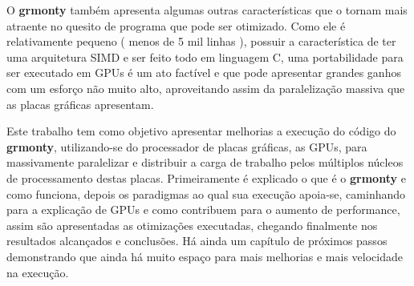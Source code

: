 O \textbf{grmonty} também apresenta algumas outras características que o tornam mais atraente no quesito de programa que pode ser otimizado. Como ele é relativamente pequeno ( menos de 5 mil linhas ), possuir a característica de ter uma arquitetura SIMD e ser feito todo em linguagem C, uma portabilidade para ser executado em GPUs é um ato factível e que pode apresentar grandes ganhos com um esforço não muito alto, aproveitando assim da paralelização massiva que as placas gráficas apresentam.

Este trabalho tem como objetivo apresentar melhorias a execução do código do \textbf{grmonty}, utilizando-se do processador de placas gráficas, as GPUs, para massivamente paralelizar e distribuir a carga de trabalho pelos múltiplos núcleos de processamento destas placas. Primeiramente é explicado o que é o \textbf{grmonty} e como funciona, depois os paradigmas ao qual sua execução apoia-se, caminhando para a explicação de GPUs e como contribuem para o aumento de performance, assim são apresentadas as otimizações executadas, chegando finalmente nos resultados alcançados e conclusões. Há ainda um capítulo de próximos passos demonstrando que ainda há muito espaço para mais melhorias e mais velocidade na execução.

%
%
%
%
%
%
%
%
